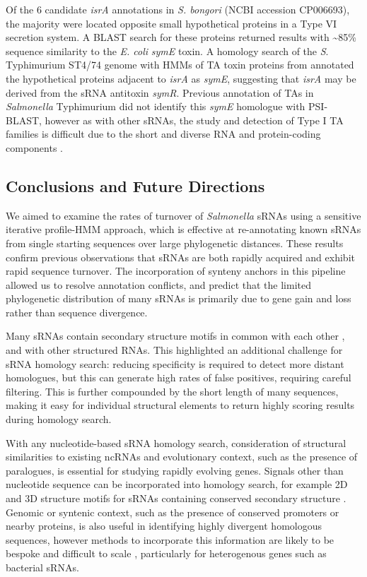Of the 6 candidate \textit{isrA} annotations in \textit{S. bongori} (NCBI accession CP006693), the majority were located opposite small hypothetical proteins in a Type VI secretion system. A BLAST search for these proteins returned results with \textasciitilde85\% sequence similarity to the \textit{E. coli} \textit{symE} toxin. A homology search of the \textit{S}. Typhimurium ST4/74 genome with HMMs of TA toxin proteins from \cite{Coray2017-sb} annotated the hypothetical proteins adjacent to \textit{isrA} as \textit{symE}, suggesting that \textit{isrA} may be derived from the sRNA antitoxin \textit{symR}. Previous annotation of TAs in \textit{Salmonella} Typhimurium \citep{Lobato-Marquez2015-ah} did not identify this \textit{symE} homologue with PSI-BLAST, however as with other sRNAs, the study and detection of Type I TA families is difficult due to the short and diverse RNA and protein-coding components \citep{Coray2017-sb}. 

\subsection{Conclusions and Future Directions}

We aimed to examine the rates of turnover of \textit{Salmonella} sRNAs using a sensitive iterative profile-HMM approach, which is effective at re-annotating known sRNAs from single starting sequences over large phylogenetic distances. These results confirm previous observations that sRNAs are both rapidly acquired and exhibit rapid sequence turnover. The incorporation of synteny anchors in this pipeline allowed us to resolve annotation conflicts, and predict that the limited phylogenetic distribution of many sRNAs is primarily due to gene gain and loss rather than sequence divergence. 

Many sRNAs contain secondary structure motifs in common with each other \citep{Gardner2015-cxxo}, and with other structured RNAs. This highlighted an additional challenge for sRNA homology search: reducing specificity is required to detect more distant homologues, but this can generate high rates of false positives, requiring careful filtering. This is further compounded by the short length of many sequences, making it easy for individual structural elements to return highly scoring results during homology search. 

With any nucleotide-based sRNA homology search, consideration of structural similarities to existing ncRNAs and evolutionary context, such as the presence of paralogues, is essential for studying rapidly evolving genes. Signals other than nucleotide sequence can be incorporated into homology search, for example 2D and 3D structure motifs for sRNAs containing conserved secondary structure \citep{Gardner2015-cxxo,Barquist2016-qt}. Genomic or syntenic context, such as the presence of conserved promoters or nearby proteins, is also useful in identifying highly divergent homologous sequences, however methods to incorporate this information are likely to be bespoke and difficult to scale \citep{Menzel2009-nxxs}, particularly for heterogenous genes such as bacterial sRNAs.

